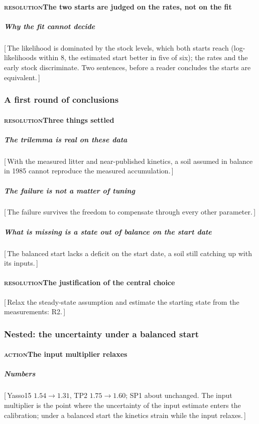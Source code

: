 \documentclass[11pt]{article}
\newcounter{subsubparagraph}[subparagraph]
\newcommand{\beat}[1]{\textcolor{black!45}{\textsc{\small #1}}\enspace}
\newcommand{\gap}[1]{\textcolor{red!70!black}{\small[\,#1\,]}}
\begin{document}
\paragraph{\beat{resolution}The two starts are judged on the rates, not on the fit}
\subparagraph{Why the fit cannot decide}
\gap{The likelihood is dominated by the stock levels, which both starts reach
(log-likelihoods within $8$, the estimated start better in five of six); the rates and the
early stock discriminate. Two sentences, before a reader concludes the starts are
equivalent.}

\subsubsection{A first round of conclusions}
\paragraph{\beat{resolution}Three things settled}
\subparagraph{The trilemma is real on these data}
\gap{With the measured litter and near-published kinetics, a soil assumed in balance in 1985
cannot reproduce the measured accumulation.}
\subparagraph{The failure is not a matter of tuning}
\gap{The failure survives the freedom to compensate through every other parameter.}
\subparagraph{What is missing is a state out of balance on the start date}
\gap{The balanced start lacks a deficit on the start date, a soil still catching up with its
inputs.}
\paragraph{\beat{resolution}The justification of the central choice}
\gap{Relax the steady-state assumption and estimate the starting state from the measurements:
R2.}

\subsubsection{Nested: the uncertainty under a balanced start}
\paragraph{\beat{action}The input multiplier relaxes}
\subparagraph{Numbers}
\gap{Yasso15 $1.54 \rightarrow 1.31$, TP2 $1.75 \rightarrow 1.60$; SP1 about unchanged. The
input multiplier is the point where the uncertainty of the input estimate enters the
calibration; under a balanced start the kinetics strain while the input relaxes.}
\end{document}
